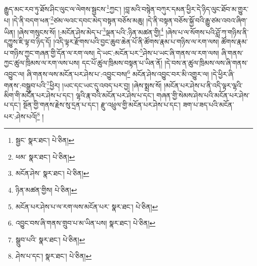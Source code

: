 རྒྱུད་མང་རབ་ཏུ་ཐོས་ཤིང་ལུང་ལ་ལེགས་སྦྱངས་\footnote{སྦྱང་  སྣར་ཐང་།  པེ་ཅིན། }ཀྱང་། །བླ་མའི་བསྙེན་བཀུར་དམན་ཕྱིར་དེ་ཉིད་ལུང་ཐོབ་མ་གྱུར་པ། །དེ་ནི་བདག་ཕན་\footnote{ཕམ་  སྣར་ཐང་།  པེ་ཅིན། }ཙམ་ལའང་དབང་མེད་བསྟན་བཅོས་མཆུ། །དེ་ནི་བསྟན་བཅོས་སྐྱོ་བའི་རྒྱུ་ཙམ་འབའ་ཞིག་ཡིན། །ཞེས་གསུངས་སོ། །:མངོན་ཤེས་མེད་པ་\footnote{མངོན་ཤེས་  སྣར་ཐང་།  པེ་ཅིན། }ལྡན་པའི་:ཉིན་མཚན་གྱི།\footnote{ཉིན་མཚན་གྱིས།  པེ་ཅིན། } །ཞེས་པ་ལ་སོགས་པའི་ཤློ་ཀ་གཉིས་ནི་དཀྱུས་ཇི་ལྟ་བ་ཉིད་དོ། །འདི་ལྟར་རྫོགས་པའི་བྱང་ཆུབ་ཆེན་པོ་ནི་ཚོགས་རྣམ་པ་གཉིས་ལ་རག་ལས། ཚོགས་རྣམ་པ་གཉིས་ཀྱང་གཞན་གྱི་དོན་ལ་རག་ལས། དེ་ཡང་:མངོན་པར་\footnote{མངོན་པར་ཤེས་པ་ལ་རག་ལས་མངོན་པར་  སྣར་ཐང་།  པེ་ཅིན། }ཤེས་པ་ཡང་ཞི་གནས་ལ་རག་ལས། ཞི་གནས་ཀྱང་ཚུལ་ཁྲིམས་ལ་རག་ལས་པས། དང་པོ་ཚུལ་ཁྲིམས་བསྟན་པ་ཡིན་ནོ། །དེ་བས་ན་ཚུལ་ཁྲིམས་ལས་ཞི་གནས་འབྱུང་ལ། ཞི་གནས་ལས་མངོན་པར་ཤེས་པ་:འབྱུང་བས།\footnote{འབྱུང་བས་ཞི་གནས་གྲུབ་པ་མ་ཡིན་པས།  སྣར་ཐང་།  པེ་ཅིན། } མངོན་ཤེས་འབྱུང་བར་མི་འགྱུར་ལ། །དེ་ཕྱིར་ཞི་གནས་:བསྒྲུབ་པའི་\footnote{སྒྲུབ་པའི་  སྣར་ཐང་།  པེ་ཅིན། }ཕྱིར། །ཡང་དང་ཡང་དུ་འབད་པར་བྱ། །ཞེས་སྨྲས་སོ། །མངོན་པར་ཤེས་པ་ནི་འདི་ལྟར་ལྷའི་མིག་གི་མངོན་པར་ཤེས་པ་དང་། ལྷའི་རྣ་བའི་མངོན་པར་ཤེས་པ་དང་། གཞན་གྱི་སེམས་ཤེས་པའི་མངོན་པར་ཤེས་པ་དང་། སྔོན་གྱི་གནས་རྗེས་སུ་དྲན་པ་དང་། རྫུ་འཕྲུལ་གྱི་མངོན་པར་ཤེས་པ་དང་། ཟག་པ་ཟད་པའི་མངོན་པར་:ཤེས་པའོ།\footnote{ཤེས་པ་དང་།  སྣར་ཐང་།  པེ་ཅིན། } །
